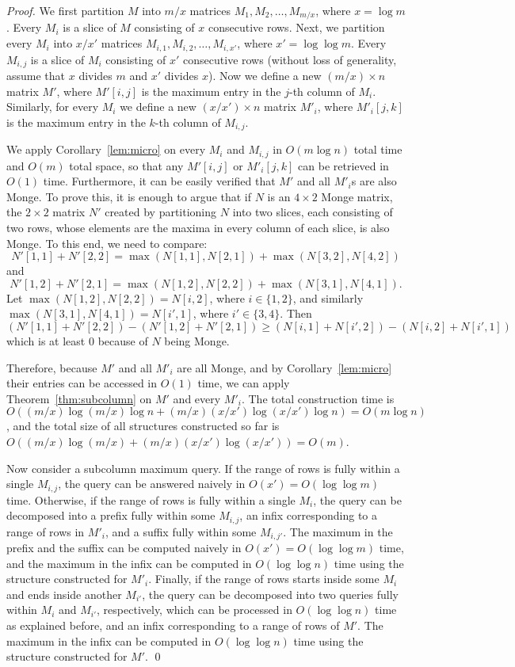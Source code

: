 \documentclass{llncs}
\begin{document}
\begin{proof}
We first partition $M$ into $m/x$ matrices
$M_{1},M_{2},\ldots,M_{m/x}$, where $x=\log m$.
Every $M_{i}$ is a slice of $M$ consisting of $x$ consecutive rows. Next,  we partition
every $M_{i}$ into $x/x'$ matrices $M_{i,1},M_{i,2},\ldots,M_{i,x'}$, where $x'=\log\log m$.
Every $M_{i,j}$ is a slice of $M_{i}$ consisting of $x'$ consecutive rows (without loss of generality, assume that $x$ divides $m$ and $x'$ divides $x$).
Now we define a new $(m/x)\times n$ matrix $M'$, where $M'[i,j]$ is the maximum
entry in the $j$-th column of $M_{i}$. Similarly, for every $M_{i}$ we define
a new $(x/x')\times n$ matrix $M'_{i}$, where $M'_{i}[j,k]$ is the maximum entry
in the $k$-th column of $M_{i,j}$.

We apply Corollary~\ref{lem:micro} on every $M_{i}$ and $M_{i,j}$ in $O(m\log n)$ total time
and $O(m)$ total space, so that any $M'[i,j]$ or $M'_{i}[j,k]$ can be retrieved in $O(1)$ time. Furthermore,
it can be easily verified that $M'$ and all $M'_{i}$s are also Monge. 
To prove this, it is enough to argue that if $N$ is an $4\times 2$
Monge matrix,
the $2\times 2$ matrix $N'$ created by partitioning $N$ into two
slices, each consisting
of two rows, whose elements are the maxima in every column of each slice, is also
Monge. To this end, we need to compare:
$$N'[1,1]+N'[2,2]=\max(N[1,1],N[2,1])+\max(N[3,2],N[4,2])$$
and
$$N'[1,2]+N'[2,1]=\max(N[1,2],N[2,2])+ \max(N[3,1],N[4,1]).$$
Let $\max(N[1,2],N[2,2])=N[i,2]$, where $i\in \{1,2\}$, and similarly
$\max(N[3,1],N[4,1])=N[i',1]$, where $i'\in \{3,4\}$. Then
$$(N'[1,1]+N'[2,2]) - (N'[1,2]+N'[2,1])  \geq (N[i,1] + N[i',2]) - (N[i,2]+N[i',1])$$
which is at least $0$ because of $N$ being Monge.
  
Therefore, because $M'$ and all $M'_{i}$ are all Monge, and
by Corollary~\ref{lem:micro} their entries can be accessed in $O(1)$ time, 
we can apply Theorem~\ref{thm:subcolumn} on $M'$
and every $M'_{i}$. The total construction time is 
$O((m/x)\log(m/x)\log n+(m/x)(x/x')\log(x/x')\log n)=O(m\log n)$, 
and the total size of all structures constructed so far is 
$O((m/x)\log(m/x)+(m/x)(x/x')\log(x/x'))=O(m)$.

Now consider a subcolumn maximum query. If the range of rows is fully within a single
$M_{i,j}$, the query can be answered naively in $O(x')=O(\log\log m)$ time.
Otherwise, if the range of rows is fully within a single $M_{i}$, the query can be decomposed
into a prefix fully within some $M_{i,j}$, an infix corresponding to a range of rows
in $M'_{i}$, and a suffix fully within some $M_{i,j'}$. The maximum in the prefix and the suffix can
be computed naively in $O(x')=O(\log\log m)$ time, and the maximum in the infix
can be computed in $O(\log\log n)$ time using the structure constructed for $M'_{i}$.
Finally, if the range of rows starts inside some $M_{i}$ and ends inside another $M_{i'}$,
the query can be decomposed into two queries fully within $M_{i}$ and $M_{i'}$, respectively,
which can be processed in $O(\log\log n)$ time as explained before, and an infix
corresponding to a range of rows of $M'$. The maximum in the infix can be computed
in $O(\log\log n)$ time using the structure constructed for $M'$.
\qed \end{proof}
\end{document}
